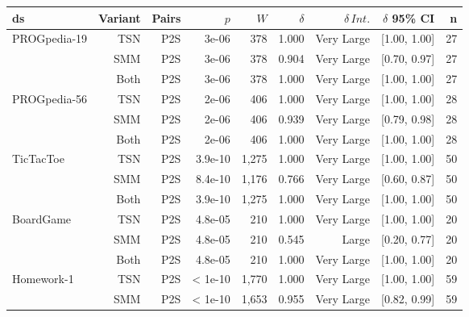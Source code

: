 \begin{table}[h]
	\centering
	\small
	\begin{tabular}{lrrrrrrrr}
		\toprule
		ds                              & Variant & Pairs & $p$     & $W$   & $\delta$ & $\delta\,Int.$ & $\delta$ 95\% CI & n  \\ 
		\midrule
		\multirow{3}{*}{{PROGpedia-19}} & TSN     & P2S   & 3e-06   & 378   & 1.000    & Very Large     & [1.00, 1.00]     & 27 \\ 
		                                & SMM     & P2S   & 3e-06   & 378   & 0.904    & Very Large     & [0.70, 0.97]     & 27 \\ 
		                                & Both    & P2S   & 3e-06   & 378   & 1.000    & Very Large     & [1.00, 1.00]     & 27 \\ 
		\hline
		\multirow{3}{*}{{PROGpedia-56}} & TSN     & P2S   & 2e-06   & 406   & 1.000    & Very Large     & [1.00, 1.00]     & 28 \\ 
		                                & SMM     & P2S   & 2e-06   & 406   & 0.939    & Very Large     & [0.79, 0.98]     & 28 \\ 
		                                & Both    & P2S   & 2e-06   & 406   & 1.000    & Very Large     & [1.00, 1.00]     & 28 \\ 
        \hline
		\multirow{3}{*}{{TicTacToe}}    & TSN     & P2S   & 3.9e-10 & 1,275 & 1.000    & Very Large     & [1.00, 1.00]     & 50 \\ 
		                                & SMM     & P2S   & 8.4e-10 & 1,176 & 0.766    & Very Large     & [0.60, 0.87]     & 50 \\ 
		                                & Both    & P2S   & 3.9e-10 & 1,275 & 1.000    & Very Large     & [1.00, 1.00]     & 50 \\ 
        \hline
		\multirow{3}{*}{{BoardGame}}    & TSN     & P2S   & 4.8e-05 & 210   & 1.000    & Very Large     & [1.00, 1.00]     & 20 \\ 
		                                & SMM     & P2S   & 4.8e-05 & 210   & 0.545    & Large          & [0.20, 0.77]     & 20 \\ 
		                                & Both    & P2S   & 4.8e-05 & 210   & 1.000    & Very Large     & [1.00, 1.00]     & 20 \\ 
		\hline
		\multirow{3}{*}{{Homework-1}}   & TSN     & P2S   & < 1e-10 & 1,770 & 1.000    & Very Large     & [1.00, 1.00]     & 59 \\ 
		                                & SMM     & P2S   & < 1e-10 & 1,653 & 0.955    & Very Large     & [0.82, 0.99]     & 59 \\ 

\end{tabular}
\end{table}
